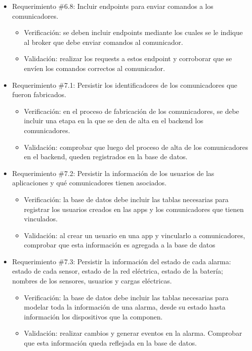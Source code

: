 \documentclass[
11pt, %
codirector, %
]{charter}
\begin{document}
\begin{itemize}
	\item Requerimiento \#6.8: Incluir endpoints para enviar comandos a los comunicadores.
	\begin{itemize}
		\item Verificación: se deben incluir endpoints mediante los cuales se le indique al broker que debe enviar comandos al comunicador.
		\item Validación: realizar los requests a estos endpoint y corroborar que se envíen los comandos correctos al comunicador.
	\end{itemize}
			
	\item Requerimiento \#7.1: Persistir los identificadores de los comunicadores que fueron fabricados.
	\begin{itemize}
		\item Verificación: en el proceso de fabricación de los comunicadores, se debe incluir una etapa en la que se den de alta en el backend los comunicadores.
		\item Validación: comprobar que luego del proceso de alta de los comunicadores en el backend, queden registrados en la base de datos.
	\end{itemize}
			
	\item Requerimiento \#7.2: Persistir la información de los usuarios de las aplicaciones y qué comunicadores tienen asociados.
	\begin{itemize}
		\item Verificación: la base de datos debe incluir las tablas necesarias para registrar los usuarios creados en las apps y los comunicadores que tienen vinculados.
		\item Validación: al crear un usuario en una app y vincularlo a comunicadores, comprobar que esta información es agregada a la base de datos
	\end{itemize}
			
	\item Requerimiento \#7.3: Persistir la información del estado de cada alarma: estado de cada sensor, estado de la red eléctrica, estado de la batería; nombres de los sensores, usuarios y cargas eléctricas.
	\begin{itemize}
		\item Verificación: la base de datos debe incluir las tablas necesarias para modelar toda la información de una alarma, desde su estado hasta información los dispositivos que la componen.
		\item Validación: realizar cambios y generar eventos en la alarma. Comprobar que esta información queda reflejada en la base de datos.
	\end{itemize}
		
\end{itemize}
\end{document}
